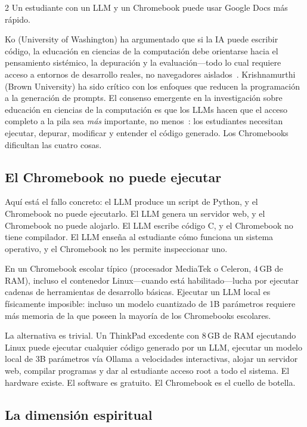 \documentclass[11pt, a4paper]{article}
\begin{document}
\begin{multicols}{2}
Un estudiante con un LLM y un Chromebook puede usar Google Docs más rápido.

Ko (University of Washington) ha argumentado que si la IA puede escribir código, la educación en ciencias de la computación debe orientarse hacia el pensamiento sistémico, la depuración y la evaluación---todo lo cual requiere acceso a entornos de desarrollo reales, no navegadores aislados~\citep{denny2024computing}. Krishnamurthi (Brown University) ha sido crítico con los enfoques que reducen la programación a la generación de prompts. El consenso emergente en la investigación sobre educación en ciencias de la computación es que los LLMs hacen que el acceso completo a la pila sea \emph{más} importante, no menos~\citep{prather2024robots}: los estudiantes necesitan ejecutar, depurar, modificar y entender el código generado. Los Chromebooks dificultan las cuatro cosas.

\subsection{El Chromebook no puede ejecutar}

Aquí está el fallo concreto: el LLM produce un script de Python, y el Chromebook no puede ejecutarlo. El LLM genera un servidor web, y el Chromebook no puede alojarlo. El LLM escribe código C, y el Chromebook no tiene compilador. El LLM enseña al estudiante cómo funciona un sistema operativo, y el Chromebook no les permite inspeccionar uno.

En un Chromebook escolar típico (procesador MediaTek o Celeron, 4\,GB de RAM), incluso el contenedor Linux---cuando está habilitado---lucha por ejecutar cadenas de herramientas de desarrollo básicas. Ejecutar un LLM local es físicamente imposible: incluso un modelo cuantizado de 1B parámetros requiere más memoria de la que poseen la mayoría de los Chromebooks escolares.

La alternativa es trivial. Un ThinkPad excedente con 8\,GB de RAM ejecutando Linux puede ejecutar cualquier código generado por un LLM, ejecutar un modelo local de 3B parámetros vía Ollama a velocidades interactivas, alojar un servidor web, compilar programas y dar al estudiante acceso root a todo el sistema. El hardware existe. El software es gratuito. El Chromebook es el cuello de botella.

\subsection{La dimensión espiritual}


\end{multicols}
\end{document}
